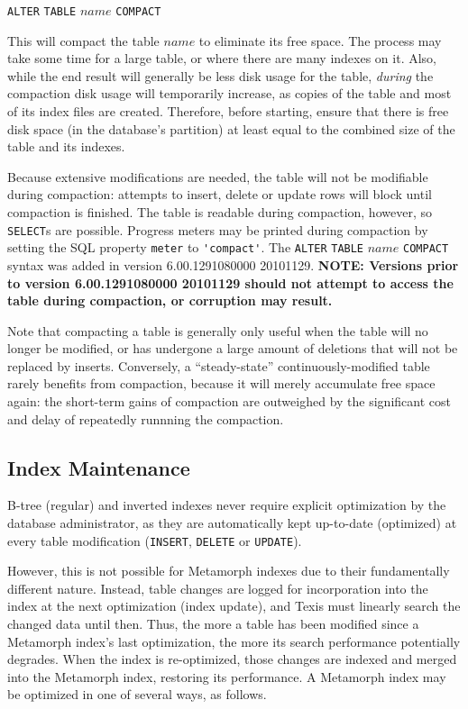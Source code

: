 \verb`ALTER` \verb`TABLE` $name$ \verb`COMPACT`

This will compact the table $name$ to eliminate its free space.  The
process may take some time for a large table, or where there are many
indexes on it.  Also, while the end result will generally be less disk
usage for the table, {\em during} the compaction disk usage will
temporarily increase, as copies of the table and most of its index
files are created.  Therefore, before starting, ensure that there is
free disk space (in the database's partition) at least equal to the
combined size of the table and its indexes.

Because extensive modifications are needed, the table will not be
modifiable during compaction: attempts to insert, delete or update
rows will block until compaction is finished.  The table is readable
during compaction, however, so \verb`SELECT`s are possible.  Progress
meters may be printed during compaction by setting the SQL property
\verb`meter` to \verb`'compact'`.  The \verb`ALTER` \verb`TABLE`
$name$ \verb`COMPACT` syntax was added in version 6.00.1291080000
20101129.  {\bf NOTE: Versions prior to version 6.00.1291080000
  20101129 should not attempt to access the table during compaction,
  or corruption may result.}

  Note that compacting a table is generally only useful when the table
will no longer be modified, or has undergone a large amount of
deletions that will not be replaced by inserts.  Conversely, a
``steady-state'' continuously-modified table rarely benefits from
compaction, because it will merely accumulate free space again: the
short-term gains of compaction are outweighed by the significant cost
and delay of repeatedly runnning the compaction.

\subsection{Index Maintenance}

  B-tree (regular) and inverted indexes never require explicit
optimization by the database administrator, as they are automatically
kept up-to-date (optimized) at every table modification
(\verb`INSERT`, \verb`DELETE` or \verb`UPDATE`).

  However, this is not possible for Metamorph indexes due to their
fundamentally different nature.  Instead, table changes are logged for
incorporation into the index at the next optimization (index update),
and Texis must linearly search the changed data until then.  Thus, the
more a table has been modified since a Metamorph index's last
optimization, the more its search performance potentially degrades.
When the index is re-optimized, those changes are indexed and merged
into the Metamorph index, restoring its performance.  A Metamorph
index may be optimized in one of several ways, as follows.

